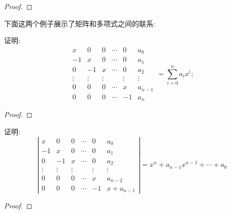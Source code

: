 \begin{proof} 
 
 
\end{proof} 


下面这两个例子展示了矩阵和多项式之间的联系:

\begin{prob} 
证明:
$$
\begin{array}{|cccccc|}
    x & 0 & 0 & \cdots & 0 & a_{0} \\
    -1 & x & 0 & \cdots & 0 & a_{1} \\
    0 & -1 & x & \cdots & 0 & a_{2} \\
    \vdots & \vdots & \vdots & & \vdots & \vdots \\
    0 & 0 & 0 & \cdots & x & a_{n-1} \\
    0 & 0 & 0 & \cdots & -1 & a_{n}
\end{array} =\sum_{i=0}^{n} a_{i} x^{i} ;
$$ 

\end{prob} 

\begin{proof} 
 
 
\end{proof} 



\begin{prob} 
    证明:
    $$
    \left|\begin{array}{cccccc}
        x & 0 & 0 & \cdots & 0 & a_{0} \\
        -1 & x & 0 & \cdots & 0 & a_{1} \\
        0 & -1 & x & \cdots & 0 & a_{2} \\
        \vdots & \vdots & \vdots & & \vdots & \vdots \\
        0 & 0 & 0 & \cdots & x & a_{n-2} \\
        0 & 0 & 0 & \cdots & -1 & x+a_{n-1}
        \end{array}\right|=x^{n}+a_{n-1} x^{n-1}+\cdots+a_{0}
    $$ 
    
\end{prob} 

\begin{proof} 
    
    
\end{proof} 


